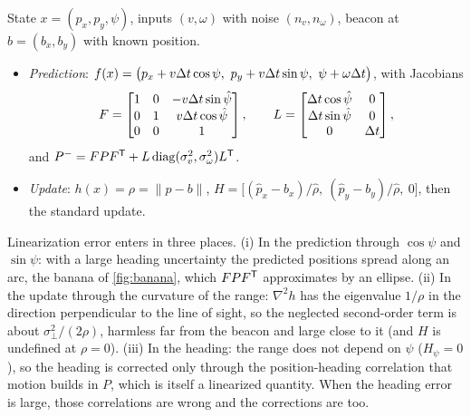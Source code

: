\begin{solutions}
  \item State $x = (p_x, p_y, \psi)$, inputs $(v, \omega)$ with noise $(n_v, n_\omega)$, beacon at $b = (b_x, b_y)$ with known position.
        \begin{itemize}[leftmargin=1.2em]
          \item \emph{Prediction}: $f(x) = \big(p_x + v{\Delta t}\cos\psi,\ p_y + v{\Delta t}\sin\psi,\ \psi + \omega{\Delta t}\big)$, with Jacobians
                \[
                  F = \begin{bmatrix}1 & 0 & -v{\Delta t}\sin\hat\psi\\ 0 & 1 & v{\Delta t}\cos\hat\psi\\ 0 & 0 & 1\end{bmatrix}, \qquad
                  L = \begin{bmatrix}{\Delta t}\cos\hat\psi & 0\\ {\Delta t}\sin\hat\psi & 0\\ 0 & {\Delta t}\end{bmatrix},
                \]
                and $P^- = FPF^{\mathsf{T}} + L\operatorname{diag}(\sigma_v^2, \sigma_\omega^2)L^{\mathsf{T}}$.
          \item \emph{Update}: $h(x) = \rho = \|p - b\|$, $H = \big[(\hat p_x - b_x)/\hat\rho,\ (\hat p_y - b_y)/\hat\rho,\ 0\big]$, then the standard update.
        \end{itemize}
        Linearization error enters in three places. (i) In the prediction through $\cos\psi$ and $\sin\psi$: with a large heading uncertainty the predicted
        positions spread along an arc, the banana of \cref{fig:banana}, which $FPF^{\mathsf{T}}$ approximates by an ellipse. (ii) In the update through the curvature of the
        range: $\nabla^2h$ has the eigenvalue $1/\rho$ in the direction perpendicular to the line of sight, so the neglected second-order term is about
        $\sigma_\perp^2/(2\rho)$, harmless far from the beacon and large close to it (and $H$ is undefined at $\rho = 0$). (iii) In the heading: the range does not
        depend on $\psi$ ($H_\psi = 0$), so the heading is corrected only through the position-heading correlation that motion builds in $P$, which is
        itself a linearized quantity. When the heading error is large, those correlations are wrong and the corrections are too.


\end{solutions}
